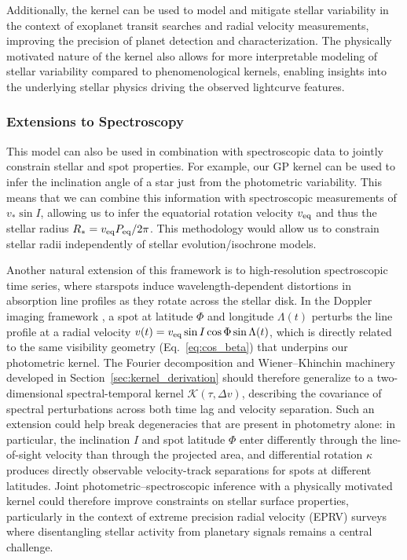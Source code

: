 \documentclass[preprint]{aastex702}
\begin{document}
Additionally, the kernel can be used to model and mitigate stellar variability in the context of exoplanet transit searches and radial velocity measurements, improving the precision of planet detection and characterization. The physically motivated nature of the kernel also allows for more interpretable modeling of stellar variability compared to phenomenological kernels, enabling insights into the underlying stellar physics driving the observed lightcurve features.

\subsubsection{Extensions to Spectroscopy}

This model can also be used in combination with spectroscopic data to jointly constrain stellar and spot properties. For example, our GP kernel can be used to infer the inclination angle of a star just from the photometric variability. This means that we can combine this information with spectroscopic measurements of $v_*\sin I$, allowing us to infer the equatorial rotation velocity $v_{\rm eq}$ and thus the stellar radius $R_* = v_{\rm eq} P_{\rm eq} / 2\pi$. This methodology would allow us to constrain stellar radii independently of stellar evolution/isochrone models.

Another natural extension of this framework is to high-resolution spectroscopic time series, where starspots induce wavelength-dependent distortions in absorption line profiles as they rotate across the stellar disk. In the Doppler imaging framework \citep[e.g.,][]{luger_mapping_2021-2}, a spot at latitude $\Phi$ and longitude $\Lambda(t)$ perturbs the line profile at a radial velocity $v(t) = v_{\rm eq} \sin I \cos\Phi \sin\Lambda(t)$, which is directly related to the same visibility geometry (Eq.~\ref{eq:cos_beta}) that underpins our photometric kernel. The Fourier decomposition and Wiener--Khinchin machinery developed in Section~\ref{sec:kernel_derivation} should therefore generalize to a two-dimensional spectral-temporal kernel $\mathcal{K}(\tau, \Delta v)$, describing the covariance of spectral perturbations across both time lag and velocity separation. Such an extension could help break degeneracies that are present in photometry alone: in particular, the inclination $I$ and spot latitude $\Phi$ enter differently through the line-of-sight velocity than through the projected area, and differential rotation $\kappa$ produces directly observable velocity-track separations for spots at different latitudes. Joint photometric--spectroscopic inference with a physically motivated kernel could therefore improve constraints on stellar surface properties, particularly in the context of extreme precision radial velocity (EPRV) surveys where disentangling stellar activity from planetary signals remains a central challenge.
\end{document}
